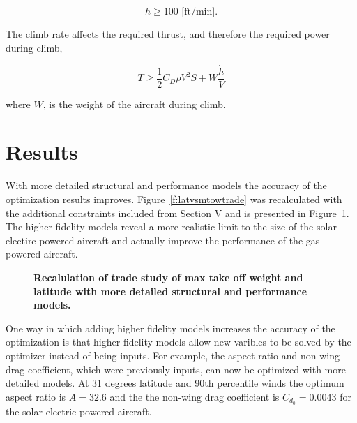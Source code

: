 \documentclass[]{aiaa-tc}%
\begin{document}
\begin{equation}
    \label{e:climbrate}
    \dot{h} \geq 100 \text{ [ft/min]}.
\end{equation}

The climb rate affects the required thrust, and therefore the required power during climb, 

\begin{equation}
    \label{e:climb}
    T \geq \frac{1}{2} C_D \rho V^2 S + W \frac{\dot{h}}{V}
\end{equation}

where $W$, is the weight of the aircraft during climb.  

\section{Results}

With more detailed structural and performance models the accuracy of the optimization results improves. 
Figure~\ref{f:latvsmtowtrade} was recalculated with the additional constraints included from Section V and is presented in Figure~\ref{f:latvsmtowtradet}. 
The higher fidelity models reveal a more realistic limit to the size of the solar-electirc powered aircraft and actually improve the performance of the gas powered aircraft.

\begin{figure}[H]
 \begin{subfigmatrix}{2}%
 \end{subfigmatrix}
 \caption{\textbf{ Recalulation of trade study of max take off weight and latitude with more detailed structural and performance models.   }}
 \label{f:latvsmtowtradet}
\end{figure}

One way in which adding higher fidelity models increases the accuracy of the optimization is that higher fidelity models allow new varibles to be solved by the optimizer instead of being inputs. 
For example, the aspect ratio and non-wing drag coefficient, which were previously inputs, can now be optimized with more detailed models.  
At 31 degrees latitude and 90th percentile winds the optimum aspect ratio is $A=32.6$ and the the non-wing drag coefficient is $C_{d_0} = 0.0043$ for the solar-electric powered aircraft.
\end{document}
